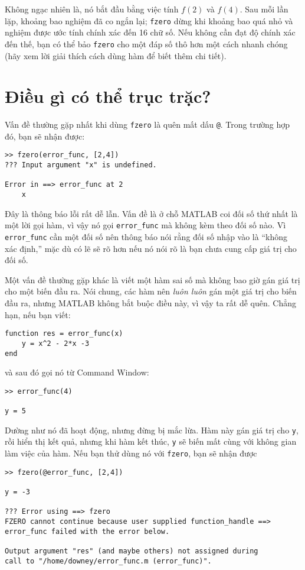 \documentclass[12pt]{book}
\begin{document}
Không ngạc nhiên là, nó bắt đầu bằng việc tính $f(2)$ và $f(4)$. 
Sau mỗi lần lặp, khoảng bao nghiệm đã co ngắn lại; {\tt fzero} 
dừng khi khoảng bao quá nhỏ và nghiệm được ước tính chính xác
đến 16 chữ số. Nếu không cần đạt độ chính xác đến thế, bạn
có thể bảo {\tt fzero} cho một đáp số thô hơn một cách nhanh
chóng (hãy xem lời giải thích cách dùng hàm để biết thêm chi tiết).


\section{Điều gì có thể trục trặc?}

Vấn đề thường gặp nhất khi dùng {\tt fzero} là quên mất dấu
{\tt @}. Trong trường hợp đó, bạn sẽ nhận được:

\begin{verbatim}
>> fzero(error_func, [2,4])
??? Input argument "x" is undefined.

Error in ==> error_func at 2
    x
\end{verbatim}

Đây là thông báo lỗi rất dễ lẫn. Vấn đề là ở chỗ MATLAB coi đối số
thứ nhất là một lời gọi hàm, vì vậy nó gọi \verb#error_func# mà
không kèm theo đối số nào. Vì \verb#error_func# cần một đối số nên
thông báo nói rằng đối số nhập vào là ``không xác định,'' mặc dù
có lẽ sẽ rõ hơn nếu nó nói rõ là bạn chưa cung cấp giá trị cho đối số.

Một vấn đề thường gặp khác là viết một hàm sai số mà không bao giờ
gán giá trị cho một biến đầu ra. Nói chung, các hàm nên 
{\em luôn luôn} gán một giá trị cho biến đầu ra, nhưng MATLAB
không bắt buộc điều này, vì vậy ta rất dễ quên. Chẳng hạn, nếu
bạn viết:

\begin{verbatim}
function res = error_func(x)
    y = x^2 - 2*x -3
end
\end{verbatim}

và sau đó gọi nó từ Command Window:

\begin{verbatim}
>> error_func(4)

y = 5
\end{verbatim}

Dường như nó đã hoạt động, nhưng đừng bị mắc lừa. Hàm này
gán giá trị cho {\tt y}, rồi hiển thị kết quả, nhưng khi hàm kết thúc,
{\tt y} sẽ biến mất cùng với không gian làm việc của hàm. Nếu bạn
thử dùng nó với {\tt fzero}, bạn sẽ nhận được

\begin{verbatim}
>> fzero(@error_func, [2,4])

y = -3

??? Error using ==> fzero
FZERO cannot continue because user supplied function_handle ==> 
error_func failed with the error below.

Output argument "res" (and maybe others) not assigned during 
call to "/home/downey/error_func.m (error_func)".
\end{verbatim}
\end{document}

